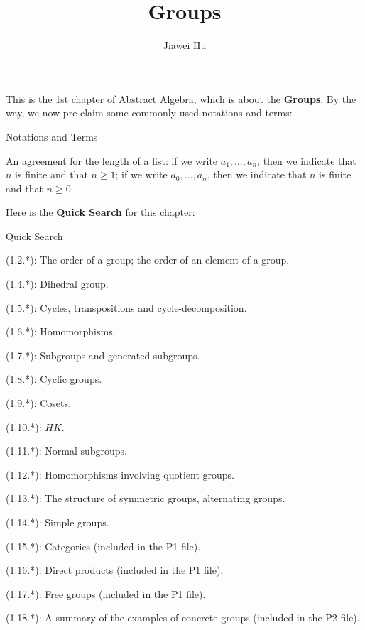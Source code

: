 \documentclass{article}
\title{\LARGE \textbf{Groups}}
\author{\large Jiawei Hu}
\begin{document}
\maketitle

This is the 1st chapter of Abstract Algebra, which is about the \textbf{Groups}. By the way, we now pre-claim some commonly-used notations and terms:
\begin{Df}{Notations and Terms}
    \begin{compactenum}
        \item An agreement for the length of a list: if we write $a_1, \dots, a_n$, then we indicate that $n$ is finite and that $n\geq 1$; if we write $a_0, \dots, a_n$, then we indicate that $n$ is finite and that $n\geq 0$.
    \end{compactenum}
\end{Df}

Here is the \textbf{Quick Search} for this chapter:
\begin{Th}{Quick Search}
    \begin{compactdesc}
        \item (1.2.*): The order of a group; the order of an element of a group.
        \item (1.4.*): Dihedral group.
        \item (1.5.*): Cycles, transpositions and cycle-decomposition.
        \item (1.6.*): Homomorphisms.
        \item (1.7.*): Subgroups and generated subgroups.
        \item (1.8.*): Cyclic groups.
        \item (1.9.*): Cosets.
        \item (1.10.*): $HK$.
        \item (1.11.*): Normal subgroups.
        \item (1.12.*): Homomorphisms involving quotient groups.
        \item (1.13.*): The structure of symmetric groups, alternating groups.
        \item (1.14.*): Simple groups.
        \item (1.15.*): Categories (included in the P1 file).
        \item (1.16.*): Direct products (included in the P1 file).
        \item (1.17.*): Free groups (included in the P1 file).
        \item (1.18.*): A summary of the examples of concrete groups (included in the P2 file).
    \end{compactdesc}
\end{Th}
\end{document}
